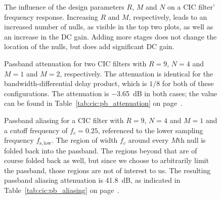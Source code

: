 \begin{figure}
    \centering
        
        \caption[Influence of Design Parameters on Frequency Response]{%
            The influence of  the design parameters $R$, $M$ and  $N$ on a CIC
            filter' frequency response.  Increasing $R$ and $M$, respectively,
            leads to an  increased number of nulls, as visible  in the top two
            plots,  as well  as  an  increase in  the  DC  gain.  Adding  more
            stages does  not change the  location of  the nulls, but  does add
            significant DC gain.%
        }
        \label{fig:cic:freq_responses:var}
\end{figure}

\begin{figure}
    \centering
        
        \caption[CIC Filter: Passband and Aliasing Attenuation]{%
            Passband   attenuation   for   two   CIC   filters   with   $R=9$,
            $N=4$   and  $M=1$   and   $M=2$,  respectively. The   attenuation
            is  identical   for  the  bandwidth-differential   delay  product,
            which   is  $1/8$   for   both  of   these  configurations.    The
            attenuation   is  \SI{-3.65}{\dB}   in  both   cases;  the   value
            can    be   found    in   Table~\ref{tab:cic:pb_attenuation}    on
            page~\pageref{tab:cic:pb_attenuation}.%
        }
        \label{fig:cic:freq_responses:passband:attenuation}
\end{figure}

\begin{figure}
    \centering
        
        \caption[CIC Filter: Passband and Aliasing Attenuation]{%
            Passband aliasing for  a CIC filter with $R =  9$, $N=4$ and $M=1$
            and a  cutoff frequency of $f_c  = 0.25$, referenced to  the lower
            sampling frequency $f_\mathrm{s,low}$.  The  region of width $f_c$
            around  every $M$th  null is  folded back  into the  passband. The
            regions beyond that  are of course folded back as  well, but since
            we choose to arbitrarily limit the passband, those regions are not
            of interest to us.  The resulting passband aliasing attenuation is
            \SI{41.8}{\dB}, as indicated in Table~\ref{tab:cic:pb_aliasing} on
            page~\pageref{tab:cic:pb_aliasing}.%
        }
        \label{fig:cic:freq_responses:passband:aliasing}
\end{figure}
%
%
